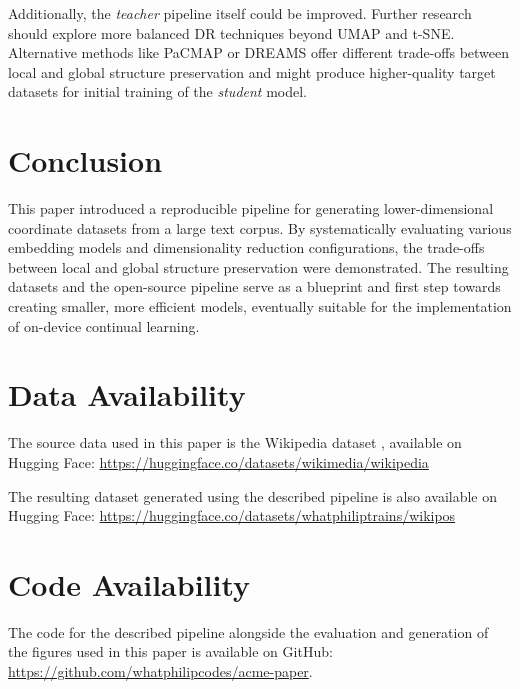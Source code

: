 Additionally, the \textit{teacher} pipeline itself could be improved. Further research should explore more balanced DR techniques beyond UMAP and t-SNE. Alternative methods like PaCMAP\cite{JMLR:v22:20-1061} or DREAMS \cite{kuryDREAMSPreservingBoth2025} offer different trade-offs between local and global structure preservation and might produce higher-quality target datasets for initial training of the \textit{student} model.

\section{Conclusion}
\label{sec:conclusion}

This paper introduced a reproducible pipeline for generating lower-dimensional coordinate datasets from a large text corpus. By systematically evaluating various embedding models and dimensionality reduction configurations, the trade-offs between local and global structure preservation were demonstrated. The resulting datasets and the open-source pipeline serve as a blueprint and first step towards creating smaller, more efficient models, eventually suitable for the implementation of on-device continual learning.

\section{Data Availability}
\label{sec:data-av}

The source data used in this paper is the Wikipedia dataset \cite{WikimediaWikipediaDatasets2025}, available on Hugging Face: \noindent\url{https://huggingface.co/datasets/wikimedia/wikipedia}

The resulting dataset generated using the described pipeline is also available on Hugging Face: \noindent\url{https://huggingface.co/datasets/whatphiliptrains/wikipos}

\section{Code Availability}
\label{sec:code-av}

The code for the described pipeline alongside the evaluation and generation of the figures used in this paper is available on GitHub: \noindent\url{https://github.com/whatphilipcodes/acme-paper}.


%







